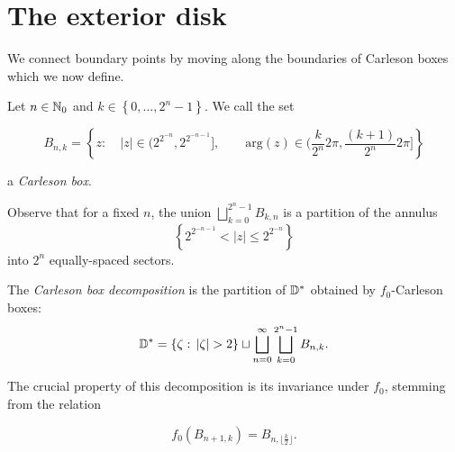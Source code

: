 \begin{comment}
We decompose $\D^{*}$ into Carleson boxes invariant under
$z^{2}$ and connect points on the unit circle by traveling on the
boundary of these boxes. Both the boxes and the path on their boundary
respect the dynamics of $z^{2}$ there, which allow us to transport
these paths from $\D^{*}$ to the exterior of $\mathcal{J}(f_{c})$ 


We construct two collections of curves, which we call "express"
and "peripheral" tracks. We use the metaphor
of a train traveling between the endpoints and switching between tracks.
We stitch the quasiconvexity certificates out of these tracks.

\end{comment}

\section{The exterior disk}

\begin{comment}
The exterior $\D^{*}=\left\{ \left|z\right|>1\right\} $ of the unit
disk is trivially quasiconvex by connecting points along the perimeter
of the circle. However, these paths follow the boundary too closely
and their length would blow up if we transport them to the exterior
of $\mathcal{J}(f_{c})$, $c\neq0$, via the Riemann map. Instead,
\end{comment}

We connect boundary points by moving along the boundaries of Carleson boxes which we now define.
\begin{definition}
Let $n\in\mathbb{N}_{0}$ and $k\in\left\{ 0,\ldots,2^{n}-1\right\} $. We
call the set

\[
B_{n,k}=\left\{ z:\quad\left|z\right|\in\biggl(2^{2^{-n}},2^{2^{-n-1}}\biggl],\qquad\mathrm{arg}(z)\in\biggl(\frac{k}{2^{n}}2\pi,\frac{(k+1)}{2^{n}}2\pi\biggl]\right\} 
\]

a \emph{Carleson box}.

Observe that for a fixed $n$, the union $\bigsqcup_{k=0}^{2^{n}-1}B_{k,n}$
is a partition of the annulus 
\[
\left\{ 2^{2^{-n-1}}<\left|z\right|\leq2^{2^{-n}}\right\} 
\]
 into $2^{n}$ equally-spaced sectors.

The \emph{Carleson box decomposition} is the partition of $\mathbb{D}^{*}$ obtained by $f_{0}$-Carleson
boxes:
\[
\D^{*}=\left\{ \zeta:\,\left|\zeta\right|>2\right\} \sqcup\bigsqcup_{n=0}^{\infty}\bigsqcup_{k=0}^{2^{n}-1}B_{n,k}.
\]

The crucial property of this decomposition is its invariance under $f_{0}$,
stemming from the relation

\[
f_{0}\left(B_{n+1,k}\right)=B_{n,\lfloor\frac{k}{2}\rfloor}.
\]
\end{definition}

